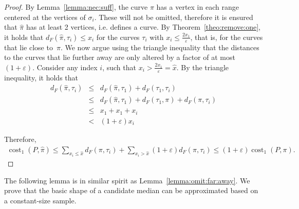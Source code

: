 \documentclass[11pt, letter]{article}
\DeclareMathOperator{\cost}{cost}
\newcommand{\thmref}[1]{Theorem~\ref{theo:#1}}
\newcommand{\lemref}[1]{Lemma~\ref{lemma:#1}}
\providecommand{\eps}{{\varepsilon}}\newcommand{\Astop}{\overline{a}}
\providecommand{\pth}[2][\!]{#1\left({#2}\right)}
\newcommand{\trajectory}[2]{\ensuremath{{#1}_{#2}}}
\newcommand{\inputSym}{\ensuremath{\tau}}
\newcommand{\inputTraj}[1]{\trajectory{\inputSym}{#1}}
\newcommand{\distFr}[2]{\ensuremath{d_F\pth{#1,#2}}}
\begin{document}
\begin{proof}
By \lemref{nec:suff}, the curve $\pi$ has a vertex in each range centered at the vertices 
of 
$\sigma_i$. These will not be omitted, therefore it is ensured that
$\widehat{\pi}$ has at least 2 vertices, i.e. defines a curve.
By  \thmref{remove:one},  it holds that
$\distFr{\widehat{\pi}}{\inputTraj{i}}\leq x_i$ for the curves $\inputTraj{i}$
with $x_i \leq \frac{2x_1}{\eps}$, that is, for the curves that lie close
to~$\pi$.
We now argue using the triangle inequality that the distances to the curves
that lie further away are only altered by a factor of at most $(1+\eps)$.
Consider any index $i$, such that $x_i > \frac{2x_1}{\eps} = \widehat{x}$.
By the triangle inequality, it holds that 
\begin{eqnarray*}
\distFr{\widehat{\pi}}{\inputTraj{i}} 
&\leq& \distFr{\widehat{\pi}}{\inputTraj{1}} + \distFr{\inputTraj{1}}{\inputTraj{i}} \\
&\leq& \distFr{\widehat{\pi}}{\inputTraj{1}} +\distFr{\inputTraj{1}}{\pi} + \distFr{\pi}{\inputTraj{i}} \\
&\leq& x_1 + x_1 + x_i \\
&<&  (1+\eps) x_i
\end{eqnarray*}



Therefore,
\begin{align*}
\cost_{1}(P,\widehat{\pi}) 
\leq \sum_{x_i \leq \widehat{x}}  \distFr{\pi}{\inputTraj{i}} 
+ \sum_{x_i > \widehat{x}} (1+\eps) \distFr{\pi}{\inputTraj{i}} 
\leq (1+\eps) \cost_{1}(P,\pi).
\end{align*}

\end{proof}

The following lemma is in similar spirit as \lemref{omit:far:away}. We prove that the
basic shape of a candidate median can be approximated based on a constant-size
sample.
\end{document}
